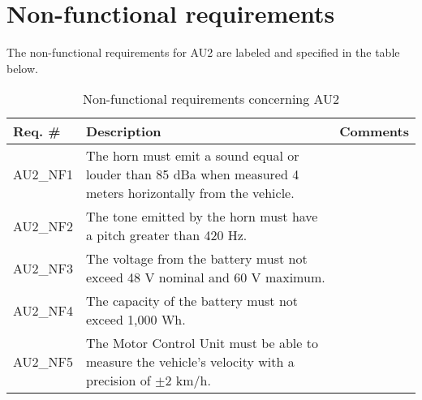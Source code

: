 \section{Non-functional requirements}
The non-functional requirements for AU2 are labeled and specified in the table below.

\begin{table}[h!]
	\centering
	\label{my-label}
	\begin{tabular}{|p{2 cm}|p{7 cm}|p{4 cm}|}
		\hline
		\textbf{Req. \#} & \textbf{Description} & \textbf{Comments} \\\hline
		AU2\_NF1	& The horn must emit a sound equal or louder than 85 dBa when measured 4 meters horizontally from the vehicle. &	\\\hline
		AU2\_NF2	& The tone emitted by the horn must have a pitch greater than 420 Hz. &	\\\hline
		AU2\_NF3	& The voltage from the battery must not exceed 48 V nominal and 60 V maximum. &	\\\hline
		AU2\_NF4	& The capacity of the battery must not exceed 1,000 Wh. &	\\\hline
		AU2\_NF5	& The Motor Control Unit must be able to measure the vehicle's velocity with a precision of $\pm$2 km/h. &	\\\hline
	\end{tabular}
	\caption{Non-functional requirements concerning AU2}
\end{table}

